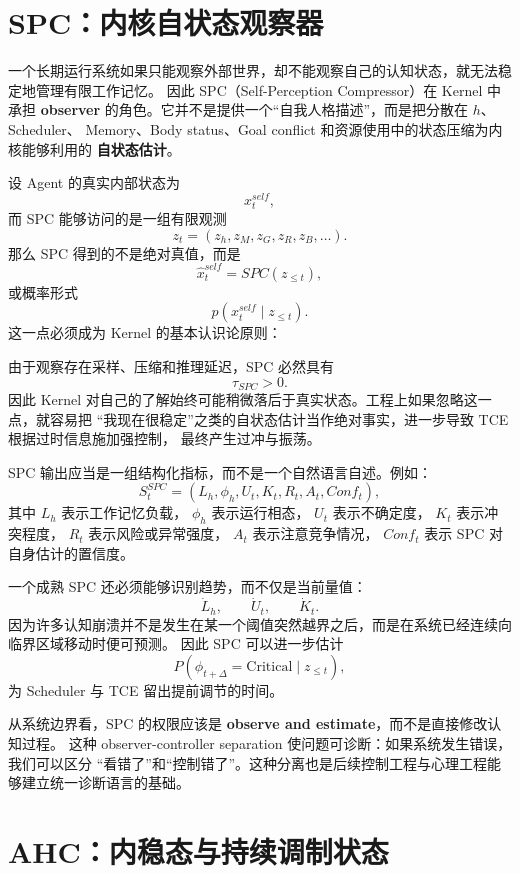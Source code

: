 \section{SPC：内核自状态观察器}

一个长期运行系统如果只能观察外部世界，却不能观察自己的认知状态，就无法稳定地管理有限工作记忆。
因此 SPC（Self-Perception Compressor）在 Kernel 中承担
\textbf{observer} 的角色。它并不是提供一个``自我人格描述''，而是把分散在 $h$、Scheduler、
Memory、Body status、Goal conflict 和资源使用中的状态压缩为内核能够利用的
\textbf{自状态估计}。

设 Agent 的真实内部状态为
\[
x_t^{self},
\]
而 SPC 能够访问的是一组有限观测
\[
z_t=
(
z_h,z_M,z_G,z_R,z_B,\ldots
).
\]
那么 SPC 得到的不是绝对真值，而是
\[
\hat x_t^{self}
=
SPC(z_{\leq t}),
\]
或概率形式
\[
p(x_t^{self}\mid z_{\leq t}).
\]
这一点必须成为 Kernel 的基本认识论原则：
\begin{statementbox}
\centering
{}
\end{statementbox}

由于观察存在采样、压缩和推理延迟，SPC 必然具有
\[
\tau_{SPC}>0.
\]
因此 Kernel 对自己的了解始终可能稍微落后于真实状态。工程上如果忽略这一点，就容易把
``我现在很稳定''之类的自状态估计当作绝对事实，进一步导致 TCE 根据过时信息施加强控制，
最终产生过冲与振荡。

SPC 输出应当是一组结构化指标，而不是一个自然语言自述。例如：
\[
S_t^{SPC}
=
(
L_h,
\phi_h,
U_t,
K_t,
R_t,
A_t,
Conf_t
),
\]
其中 $L_h$ 表示工作记忆负载，
$\phi_h$ 表示运行相态，
$U_t$ 表示不确定度，
$K_t$ 表示冲突程度，
$R_t$ 表示风险或异常强度，
$A_t$ 表示注意竞争情况，
$Conf_t$ 表示 SPC 对自身估计的置信度。

一个成熟 SPC 还必须能够识别趋势，而不仅是当前量值：
\[
\dot L_h,\qquad
\dot U_t,\qquad
\dot K_t.
\]
因为许多认知崩溃并不是发生在某一个阈值突然越界之后，而是在系统已经连续向临界区域移动时便可预测。
因此 SPC 可以进一步估计
\[
P(\phi_{t+\Delta}=\mathrm{Critical}\mid z_{\leq t}),
\]
为 Scheduler 与 TCE 留出提前调节的时间。

从系统边界看，SPC 的权限应该是
\textbf{observe and estimate}，而不是直接修改认知过程。
这种 observer-controller separation 使问题可诊断：如果系统发生错误，我们可以区分
``看错了''和``控制错了''。这种分离也是后续控制工程与心理工程能够建立统一诊断语言的基础。


\section{AHC：内稳态与持续调制状态}

